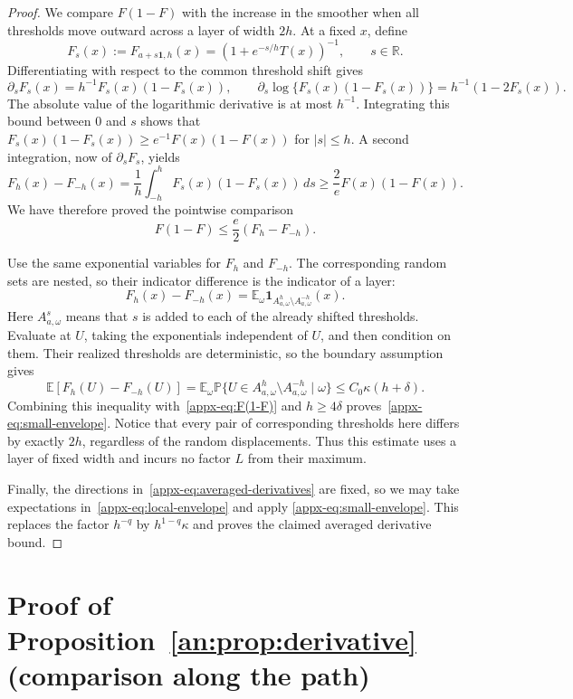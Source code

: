 \documentclass[11pt,letterpaper]{article}
\theoremstyle{remark}
\newcommand{\E}{\mathbb E}
\newcommand{\Pp}{\mathbb P}
\newcommand{\R}{\mathbb R}
\newcommand{\ind}{\mathbf 1}
\begin{document}
\begin{proof}
We compare $F(1-F)$ with the increase in the smoother when all
thresholds move outward across a layer of width $2h$. At a fixed
$x$, define
\[
 F_s(x):=F_{a+s\mathbf1,h}(x)
       =(1+e^{-s/h}T(x))^{-1},\qquad s\in\R.
\]
Differentiating with respect to the common threshold shift gives
\[
 \partial_sF_s(x)=h^{-1}F_s(x)(1-F_s(x)),
 \qquad
 \partial_s\log\{F_s(x)(1-F_s(x))\}
       =h^{-1}(1-2F_s(x)).
\]
The absolute value of the logarithmic derivative is at most $h^{-1}$.
Integrating this bound between $0$ and $s$ shows that
$F_s(x)(1-F_s(x))\ge e^{-1}F(x)(1-F(x))$ for $|s|\le h$.
A second integration, now of $\partial_sF_s$, yields
\[
 F_h(x)-F_{-h}(x)
 =\frac1h\int_{-h}^h F_s(x)(1-F_s(x))\,ds
 \ge\frac2e F(x)(1-F(x)).
\]
We have therefore proved the pointwise comparison
\begin{equation}\label{appx-eq:F(1-F)}
 F(1-F)\le\frac e2(F_h-F_{-h}).
\end{equation}

Use the same exponential variables for $F_h$ and $F_{-h}$.
The corresponding random sets are nested, so their indicator
difference is the indicator of a layer:
\[
 F_h(x)-F_{-h}(x)
 =\E_\omega\ind_{A_{a,\omega}^h\setminus
                         A_{a,\omega}^{-h}}(x).
\]
Here $A_{a,\omega}^s$ means that $s$ is added to each of the
already shifted thresholds. Evaluate at $U$, taking the exponentials
independent of $U$, and then condition on them. Their realized
thresholds are deterministic, so the boundary assumption gives
\[
 \E[F_h(U)-F_{-h}(U)]
 =\E_\omega\Pp\{U\in A_{a,\omega}^h\setminus
                        A_{a,\omega}^{-h}\mid\omega\}
 \le C_0\kappa(h+\delta).
\]
Combining this inequality with~\eqref{appx-eq:F(1-F)} and
$h\ge4\delta$ proves~\eqref{appx-eq:small-envelope}.
Notice that every pair of corresponding thresholds here differs
by exactly $2h$, regardless of the random displacements.
Thus this estimate uses a layer of fixed width and incurs no factor
$L$ from their maximum.

Finally, the directions in~\eqref{appx-eq:averaged-derivatives}
are fixed, so we may take expectations
in~\eqref{appx-eq:local-envelope} and apply
\eqref{appx-eq:small-envelope}. This replaces the factor $h^{-q}$
by $h^{1-q}\kappa$ and proves the claimed averaged derivative bound.
\end{proof}


\section{Proof of Proposition~\ref*{an:prop:derivative} (comparison along the path)}
\label{appx-sec:support}
\end{document}
